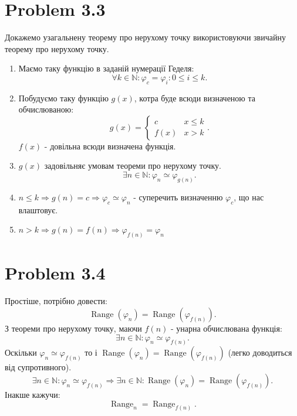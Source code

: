 \documentclass[12pt,letterpaper]{article}
\begin{document}
\section {Problem 3.3}

Докажемо узагальнену теорему про нерухому точку використовуючи звичайну теорему про нерухому точку.

\begin{enumerate}
    \item Маємо таку функцію в заданій нумерації Геделя:
        \[
            \forall k \in \mathbb{N} : \varphi_c = \varphi_i: 0 \leq i \leq k
        .\] 
    \item Побудуємо таку функцію $g(x)$, котра буде всюди визначеною та обчислюваною:
        \[
            g(x) = \begin{cases}
                c & x \leq k \\
                f(x) & x > k
            \end{cases}
        .\]
        $f(x)$ - довільна всюди визначена функція.
    \item $g(x)$ задовільняє умовам теореми про нерухому точку.
        \[
            \exists n \in \mathbb{N} : \varphi_n \simeq \varphi_{g(n)}
        .\] 
    \item $n \leq k \Rightarrow g(n) = c \Rightarrow \varphi_c \simeq \varphi_n$ - суперечить визначенню $\varphi_c$, що нас влаштовує.
    \item $n > k \Rightarrow g(n) = f(n) \Rightarrow \varphi_{f(n)} = \varphi_n$
\end{enumerate}

\section {Problem 3.4}

Простіше, потрібно довести:
\[
    \operatorname{Range}(\varphi_n) = \operatorname{Range}(\varphi_{f(n)})
.\] 
З теореми про нерухому точку, маючи $f(n)$ - унарна обчислювана функція:
\[
    \exists n \in \mathbb{N} : \varphi_n \simeq \varphi_{f(n)}
.\] 
Оскільки $\varphi_n \simeq \varphi_{f(n)}$ то і $\operatorname{Range}(\varphi_n) = \operatorname{Range}(\varphi_{f(n)})$ (легко доводиться від супротивного).
\[
    \exists n \in \mathbb{N} : \varphi_n \simeq \varphi_{f(n)} \Rightarrow \exists n \in \mathbb{N} : \operatorname{Range}(\varphi_n) = \operatorname{Range}(\varphi_{f(n)})
.\] 
Інакше кажучи:
\[
    \operatorname{Range}_n = \operatorname{Range}_{f(n)}
.\] 
\end{document}

